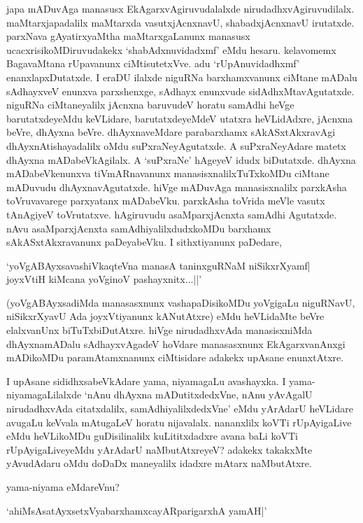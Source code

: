 japa mADuvAga manasusx EkAgarxvAgiruvudalalxde nirudadhxvAgiruvudilalx. maMtarxjapadalilx maMtarxda vasutxjAcnxnavU, shabadxjAcnxnavU irutatxde. parxNava gAyatirxyaMtha maMtarxgaLanunx manasusx ucacxrisikoMDiruvudakekx `shabAdxnuvidadxmf' eMdu hesaru. kelavomemx BagavaMtana rUpavanunx ciMtisutetxVve. adu `rUpAnuvidadhxmf' enanxlapxDutatxde. I eraDU ilalxde niguRNa barxhamxvanunx ciMtane mADalu sAdhayxveV enunxva parxshenxge, sAdhayx enunxvude sidAdhxMtavAgutatxde. niguRNa ciMtaneyalilx jAcnxna baruvudeV horatu samAdhi heVge barutatxdeyeMdu keVLidare, barutatxdeyeMdeV utatxra heVLidAdxre, jAcnxna beVre, dhAyxna beVre. dhAyxnaveMdare parabarxhamx sAkASxtAkxravAgi dhAyxnAtishayadalilx oMdu suPxraNeyAgutatxde. A suPxraNeyAdare matetx dhAyxna mADabeVkAgilalx. A `suPxraNe' hAgeyeV idudx biDutatxde. dhAyxna mADabeVkenunxva tiVmARnavanunx manasisxnalilxTuTxkoMDu ciMtane mADuvudu dhAyxnavAgutatxde. hiVge mADuvAga manasisxnalilx parxkAsha toVruvavarege parxyatanx mADabeVku. parxkAsha toVrida meVle vasutx tAnAgiyeV toVrutatxve. hAgiruvudu asaMparxjAcnxta samAdhi Agutatxde. nAvu asaMparxjAcnxta samAdhiyalilxdudxkoMDu barxhamx sAkASxtAkxravanunx paDeyabeVku. I sithxtiyanunx paDedare, 

\begin{shloka}
`yoVgABAyxsavashiVkaqteVna manasA taninxguRNaM niSikxrXyamf|\\
joyxVtiH kiMcana yoVginoV pashayxnitx$\ldots$||'
\end{shloka}

(yoVgABAyxsadiMda manasasxnunx vashapaDisikoMDu yoVgigaLu niguRNavU, niSikxrXyavU Ada joyxVtiyanunx kANutAtxre) eMdu heVLidaMte beVre elalxvanUnx biTuTxbiDutAtxre. hiVge nirudadhxvAda manasisxniMda dhAyxnamADalu sAdhayxvAgadeV hoVdare manasasxnunx EkAgarxvanAnxgi mADikoMDu paramAtamxnanunx ciMtisidare adakekx upAsane enunxtAtxre.

I upAsane sididhxsabeVkAdare yama, niyamagaLu avashayxka. I yama-niyamagaLilalxde `nAnu dhAyxna mADutitxdedxVne, nAnu yAvAgalU nirudadhxvAda citatxdalilx, samAdhiyalilxdedxVne' eMdu yArAdarU heVLidare avugaLu keVvala mAtugaLeV horatu nijavalalx. nananxlilx koVTi rUpAyigaLive eMdu heVLikoMDu guDisilinalilx kuLititxdadxre avana baLi koVTi rUpAyigaLiveyeMdu yArAdarU naMbutAtxreyeV? adakekx takakxMte yAvudAdaru oMdu doDaDx maneyalilx idadxre mAtarx naMbutAtxre.

yama-niyama eMdareVnu?

\begin{shloka}
`ahiMsAsatAyxsetxVyabarxhamxcayARparigarxhA yamAH|'
\end{shloka}


